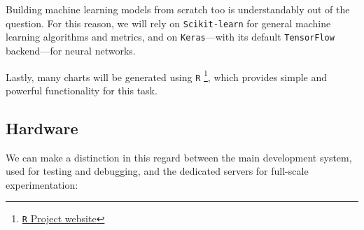 		Building machine learning models from scratch too is understandably out of the question. For this reason, we will rely on \texttt{Scikit-learn} for general machine learning algorithms and metrics, and on \texttt{Keras}---with its default \texttt{TensorFlow} backend---for neural networks.

		Lastly, many charts will be generated using \texttt{R} \footnote{\href{https://www.r-project.org/}{\texttt{R} Project website}}, which provides simple and powerful functionality for this task.

	\subsection{Hardware}

		We can make a distinction in this regard between the main development system, used for testing and debugging, and the dedicated servers for full-scale experimentation:

